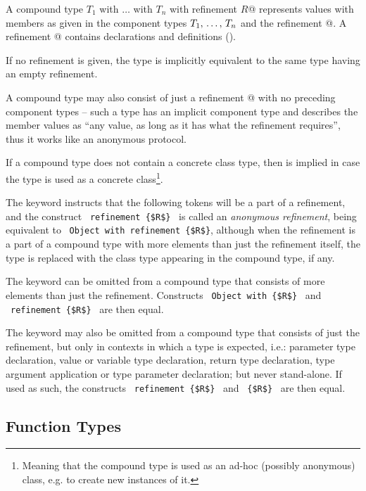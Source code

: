 A compound type \lstinline@$T_1$ with $\ldots$ with $T_n$ with refinement {$R$}@ represents values with members as given in the component types $T_1 ,\, \ldots ,\, T_n$ and the refinement @. A refinement @ contains declarations and definitions (). 

If no refinement is given, the type is implicitly equivalent to the same type having an empty refinement. 

A compound type may also consist of just a refinement @ with no preceding component types -- such a type has an implicit component type  and describes the member values as ``any value, as long as it has what the refinement requires'', thus it works like an anonymous protocol. 

If a compound type does not contain a concrete class type, then  is implied in case the type is used as a concrete class\footnote{Meaning that the compound type is used as an ad-hoc (possibly anonymous) class, e.g. to create new instances of it.}.

The keyword  instructs that the following tokens will be a part of a refinement, and the construct ~\lstinline!refinement {$R$}!~ is called an {\em anonymous refinement}, being equivalent to ~\lstinline!Object with refinement {$R$}!, although when the refinement is a part of a compound type with more elements than just the refinement itself, the  type is replaced with the class type appearing in the compound type, if any. 

The  keyword can be omitted from a compound type that consists of more elements than just the refinement. Constructs ~\lstinline!Object with {$R$}!~ and ~\lstinline!refinement {$R$}!~ are then equal. 

The  keyword may also be omitted from a compound type that consists of just the refinement, but only in contexts in which a type is expected, i.e.: parameter type declaration, value or variable type declaration, return type declaration, type argument application or type parameter declaration; but never stand-alone. If used as such, the constructs ~\lstinline!refinement {$R$}!~ and ~\lstinline!{$R$}!~ are then equal. 






\subsection{Function Types}
\label{sec:function-types}

